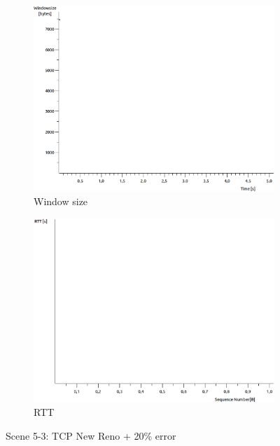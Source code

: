 \documentclass[conference,a4paper]{../../sty/IEEEtran}
\begin{document}
\begin{figure}
\begin{subfigure}[b]{0.2\textwidth}
  \includegraphics[width=\textwidth]{s5-3_wsize}
  \caption{Window size}
 \end{subfigure}
 \begin{subfigure}[b]{0.2\textwidth}
  \includegraphics[width=\textwidth]{s5-3_rtt}
  \caption{RTT}
 \end{subfigure}
 \caption{Scene 5-3: TCP New Reno + 20\% error}
\end{figure}
\end{document}
